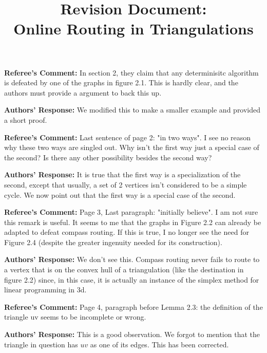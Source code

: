 \documentclass{article}
\title{Revision Document:\\
  Online Routing in Triangulations}
\newenvironment{comm}{\noindent\textbf{Referee's Comment:}}{}
\newenvironment{resp}{\noindent\textbf{Authors' Response:}}{}
\begin{document}
\maketitle

\begin{comm}
In section 2, they claim that any determinisitc
algorithm is defeated by one of the graphs in figure 2.1.
This is hardly clear, and the authors must provide
a argument to back this up.
\end{comm} 

\begin{resp}
We modified this to make a smaller example and provided a short proof.
\end{resp} 

\begin{comm}
Last sentence of page 2: "in two ways".  I see no
reason why these two ways are singled out.
Why isn't the first way just a special case
of the second?  Is there any other possibility
besides the second way?
\end{comm} 

\begin{resp}
It is true that the first way is a specialization of the second, except
that usually, a set of 2 vertices isn't considered to be a simple
cycle.  We now point out that the first way is a special case of the second.
\end{resp} 

\begin{comm}
Page 3, Last paragraph: "initially believe".
I am not sure this remark is useful.  It seems to
me that the graphs in Figure 2.2 can already
be adapted to defeat compass routing.  If this is
true, I no longer see the need for Figure 2.4 (despite
the greater ingenuity needed for its construction).
\end{comm} 

\begin{resp}
We don't see this. Compass routing never fails to route to a vertex
that is on the convex hull of a triangulation (like the destination in
figure 2.2) since, in this case, it is actually an instance of the
simplex method for linear programming in 3d.
\end{resp}
 
\begin{comm}
Page 4, paragraph before Lemma 2.3: the definition
of the triangle uv seems to be incomplete or wrong.
\end{comm} 

\begin{resp} 
This is a good observation.  We forgot to mention that the triangle in
question has $uv$ as one of its edges.  This has been corrected.
\end{resp} 
\end{document}
